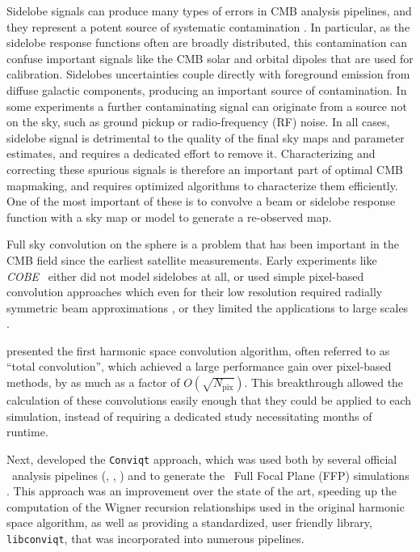 \documentclass[twocolumn]{aa}
\def\COBE{\textit{COBE}}
\begin{document}
Sidelobe signals can produce many types of errors in CMB analysis pipelines, and they represent a potent source of systematic contamination \citep[e.g.,][]{planck2014-a04,bp17}. In particular, as the sidelobe response functions often are broadly distributed, this contamination can confuse important signals like the CMB solar and orbital dipoles that are used for calibration. Sidelobes uncertainties couple directly with foreground emission from diffuse galactic components, producing an important source of contamination. In some experiments a further contaminating signal can originate from a source not on the sky, such as ground pickup or radio-frequency (RF) noise. In all cases, sidelobe signal is detrimental to the quality of the final sky maps and parameter estimates, and requires a dedicated effort to remove it. Characterizing and correcting these spurious signals is therefore an important part of optimal CMB mapmaking, and requires optimized algorithms to characterize them efficiently. One of the most important of these is to convolve a beam or sidelobe response function with a sky map or model to generate a re-observed map. 

Full sky convolution on the sphere is a problem that has been important in the CMB field since the earliest satellite measurements. Early experiments like \COBE\ \citep{cobe_sl} either did not model sidelobes at all, or used simple pixel-based convolution approaches which even for their low resolution required radially symmetric beam approximations \citep{radialapprox}, or they limited the applications to large scales \citep{burigana2001}.

\citet{Wandelt:2001} presented the first harmonic space convolution algorithm, often referred to as ``total convolution'', which achieved a large performance gain over pixel-based methods, by as much as a factor of $O(\sqrt{N_\mathrm{pix}})$. This breakthrough allowed the calculation of these convolutions easily enough that they could be applied to each simulation, instead of requiring a dedicated study necessitating months of runtime. 


Next, \citet{conviqt} developed the \texttt{Conviqt} approach, which was used both by several official \Planck\ analysis pipelines (\citealt{planck2014-a04}, \citealt{planck2014-a10}, \citealt{npipe}) and to generate the \Planck\ Full Focal Plane (FFP) simulations \citep{planck2014-a14}. This approach was an improvement over the state of the art, speeding up the computation of the Wigner recursion relationships used in the original harmonic space algorithm, as well as providing a standardized, user friendly library, \texttt{libconviqt}, that was incorporated into numerous pipelines. 
\end{document}
